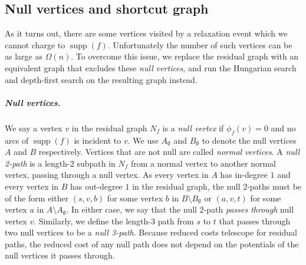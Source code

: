 \documentclass[a4paper,UKenglish]{socg-lipics-v2018}
\makeatletter
\def\fsupply{\phi}
\def\supp{\operatorname{supp}}
\theoremstyle{plain}
\numberwithin{figure}{section}
\renewcommand{\paragraph}{\subparagraph}
\def\EMPH#1{\textcolor{BrickRed}{{\emph{#1}}}}
\def\n@te#1{\textsf{\boldmath \textbf{$\langle\!\langle$#1$\rangle\!\rangle$}}\leavevmode}
\def\note#1{\textcolor{red}{\n@te{#1}}}
\renewcommand{\note}[1]{} %
\makeatother
\begin{document}
\subsection{Null vertices and shortcut graph}


As it turns out, there are some vertices visited by a relaxation event which we cannot charge to $\supp(f)$.
Unfortunately the number of such vertices can be as large as $\Omega(n)$.
%
To overcome this issue, we replace the residual graph with an equivalent graph that excludes these \emph{null vertices},
and run the Hungarian search and depth-first search on the resulting graph instead.

\paragraph{Null vertices.}
We say a vertex $v$ in the residual graph $N_f$ is a \EMPH{null vertex} if $\fsupply_f(v) = 0$ and no arcs of $\supp(f)$ is incident to $v$.
We use \EMPH{$A_\emptyset$} and \EMPH{$B_\emptyset$} to denote the null vertices $A$ and $B$ respectively.
Vertices that are not null are called \EMPH{normal vertices}.
%
A \EMPH{null 2-path} is a length-$2$ subpath in $N_f$ from a normal vertex to another normal vertex, passing through a null vertex.
As every vertex in $A$ has in-degree $1$ and every vertex in $B$ has out-degree $1$ in the residual graph, the null 2-paths must be of the form either $(s, v, b)$ for some vertex $b$ in $B \setminus B_\emptyset$ or $(a, v, t)$ for some vertex $a$ in $A \setminus A_\emptyset$.
In either case, we say that the null 2-path \EMPH{passes through} null vertex $v$.
%
Similarly, we define the length-$3$ path from $s$ to $t$ that passes through two null
vertices to be a \EMPH{null 3-path}.
%
Because reduced costs telescope for residual paths, the reduced cost of any null path does not depend on the potentials of the null vertices it passes through.
\end{document}
